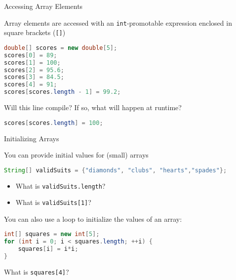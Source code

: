 \documentclass{beamer}
\begin{document}
\begin{frame}[fragile]{Accessing Array Elements}


Array elements are accessed with an {\tt int}-promotable expression enclosed in square brackets ({\tt []})
\begin{lstlisting}[language=Java]
double[] scores = new double[5];
scores[0] = 89;
scores[1] = 100;
scores[2] = 95.6;
scores[3] = 84.5;
scores[4] = 91;
scores[scores.length - 1] = 99.2;
\end{lstlisting}


\vspace{.1in}
Will this line compile?  If so, what will happen at runtime?
\begin{lstlisting}[language=Java]
scores[scores.length] = 100;
\end{lstlisting}


\end{frame}

\begin{frame}[fragile]{Initializing Arrays}


You can provide initial values for (small) arrays
\begin{lstlisting}[language=Java]
String[] validSuits = {"diamonds", "clubs", "hearts","spades"};
\end{lstlisting}

\begin{itemize}
\item What is {\tt validSuits.length}?
\item What is {\tt validSuits[1]}?
\end{itemize}

You can also use a loop to initialize the values of an array:
\begin{lstlisting}[language=Java]
int[] squares = new int[5];
for (int i = 0; i < squares.length; ++i) {
    squares[i] = i*i;
}
\end{lstlisting}

What is {\tt squares[4]}?

\end{frame}
\end{document}
